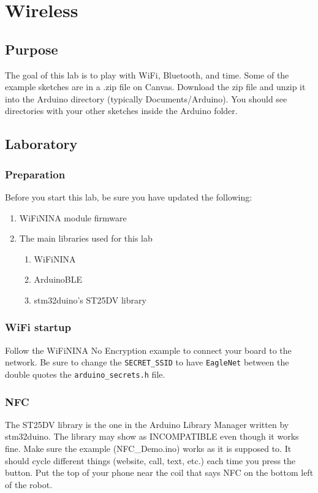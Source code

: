 \chapter{Wireless}

\section{Purpose}
The goal of this lab is to play with WiFi, Bluetooth, and time. Some of the example
sketches are in a .zip file on Canvas. Download the zip file and unzip it into the 
Arduino directory (typically Documents/Arduino). You should see directories with 
your other sketches inside the Arduino folder.

\section{Laboratory}
\subsection{Preparation}
Before you start this lab, be sure you have updated the following:
\begin{enumerate}
    \item WiFiNINA module firmware
    \item The main libraries used for this lab 
    \begin{enumerate}
        \item WiFiNINA
        \item ArduinoBLE
        \item stm32duino's ST25DV library
    \end{enumerate}
\end{enumerate}

\subsection{WiFi startup}
Follow the WiFiNINA No Encryption example to connect your board to the network. Be 
sure to change the \lstinline|SECRET_SSID| to have \lstinline|EagleNet| between the 
double quotes the \lstinline|arduino_secrets.h| file.

\subsection{NFC}
The ST25DV library is the one in the Arduino Library Manager written by stm32duino.
The library may show as INCOMPATIBLE even though it works fine. Make sure the 
example (NFC\_Demo.ino) works as it is supposed to. It should cycle 
different things (website, call, text, etc.) each time you press the button. Put 
the top of your phone near the coil that says NFC on the bottom left of the robot.

